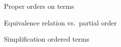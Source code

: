 \documentclass{clseminar}
\begin{document}
\begin{figure}
    \begin{center}

\caption{Proper orders on terms}
    \end{center}
\end{figure}

\begin{figure}
    \begin{center}

\caption{Equivalence relation vs.~partial order}
\end{center}
\end{figure}

\providecommand{\ma}{a}
\providecommand{\mb}{b}
\providecommand{\mc}{c}
\providecommand{\mf}{f}
\providecommand{\mcT}{T}

\begin{figure}
    \begin{center}
        
\caption{Simplification ordered terms}
\end{center}
\end{figure}
\end{document}

